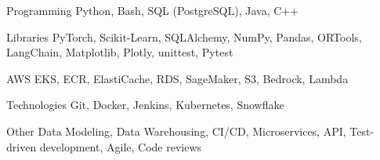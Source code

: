 


\begin{cvskills}


\cvskill
{Programming} %
{Python, Bash, SQL (PostgreSQL), Java, C++} %


\cvskill
{Libraries} %
{PyTorch, Scikit-Learn, SQLAlchemy, NumPy, Pandas, ORTools, LangChain, Matplotlib, Plotly, unittest, Pytest} %


\cvskill
{AWS} %
{EKS, ECR, ElastiCache, RDS, SageMaker, S3, Bedrock, Lambda} %


\cvskill
{Technologies} %
{Git, Docker, Jenkins, Kubernetes, Snowflake} %


\cvskill
{Other} %
{Data Modeling, Data Warehousing, CI/CD, Microservices, API, Test-driven development, Agile, Code reviews} %


\end{cvskills}